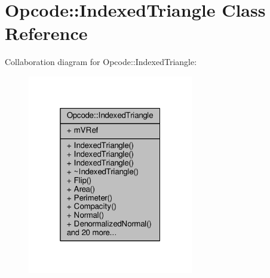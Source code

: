\hypertarget{classOpcode_1_1IndexedTriangle}{}\section{Opcode\+:\+:Indexed\+Triangle Class Reference}
\label{classOpcode_1_1IndexedTriangle}


Collaboration diagram for Opcode\+:\+:Indexed\+Triangle\+:
\nopagebreak
\begin{figure}[H]
\begin{center}
\leavevmode
\includegraphics[width=205pt]{d0/d63/classOpcode_1_1IndexedTriangle__coll__graph}
\end{center}
\end{figure}
